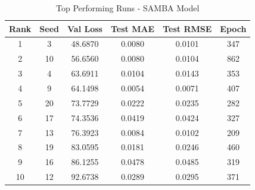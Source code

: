 \begin{table}[ht]
\centering
\caption{Top Performing Runs - SAMBA Model}
\label{tab:samba_results}
\begin{tabular}{cccccc}
\hline
\textbf{Rank} & \textbf{Seed} & \textbf{Val Loss} & \textbf{Test MAE} & \textbf{Test RMSE} & \textbf{Epoch} \\
\hline
1 & 3 & 48.6870 & 0.0080 & 0.0101 & 347 \\
2 & 10 & 56.6560 & 0.0080 & 0.0104 & 862 \\
3 & 4 & 63.6911 & 0.0104 & 0.0143 & 353 \\
4 & 9 & 64.1498 & 0.0054 & 0.0071 & 407 \\
5 & 20 & 73.7729 & 0.0222 & 0.0235 & 282 \\
6 & 17 & 74.3536 & 0.0419 & 0.0424 & 327 \\
7 & 13 & 76.3923 & 0.0084 & 0.0102 & 209 \\
8 & 19 & 83.0595 & 0.0181 & 0.0246 & 460 \\
9 & 16 & 86.1255 & 0.0478 & 0.0485 & 319 \\
10 & 12 & 92.6738 & 0.0289 & 0.0295 & 371 \\
\hline
\end{tabular}
\end{table}
